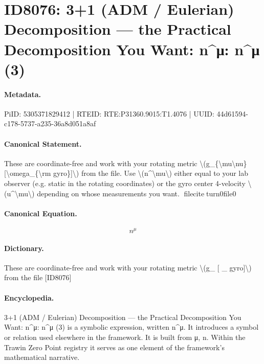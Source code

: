\section*{ID8076: 3+1 (ADM / Eulerian) Decomposition — the Practical Decomposition You Want: n\textasciicircum{}μ: n\textasciicircum{}μ (3)}
\paragraph{Metadata.}
PiID: 5305371829412 | RTEID: RTE:P31360.9015:T1.4076 | UUID: 44d61594-c178-5737-a235-36a8d051a8af

\paragraph{Canonical Statement.}
These are coordinate-free and work with your rotating metric \textbackslash{}(g\_\{\textbackslash{}mu\textbackslash{}nu\}[\textbackslash{}omega\_\{\textbackslash{}rm gyro\}]\textbackslash{}) from the file. Use \textbackslash{}(n\textasciicircum{}\textbackslash{}mu\textbackslash{}) either equal to your lab observer (e.g. static in the rotating coordinates) or the gyro center 4-velocity \textbackslash{}(u\textasciicircum{}\textbackslash{}mu\textbackslash{}) depending on whose measurements you want. fileciteturn0file0

\paragraph{Canonical Equation.}
\[
n^\mu
\]

\paragraph{Dictionary.}
These are coordinate-free and work with your rotating metric \textbackslash{}(g\_ [ \_ gyro]\textbackslash{}) from the file [ID8076]

\paragraph{Encyclopedia.}
3+1 (ADM / Eulerian) Decomposition — the Practical Decomposition You Want: n\textasciicircum{}μ: n\textasciicircum{}μ (3) is a symbolic expression, written n\textasciicircum{}μ. It introduces a symbol or relation used elsewhere in the framework. It is built from μ, n. Within the Trawin Zero Point registry it serves as one element of the framework's mathematical narrative.
